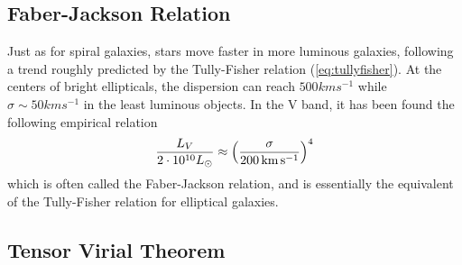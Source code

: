 \subsection{Faber-Jackson Relation}

Just as for spiral galaxies, stars move faster in more luminous galaxies, following a trend roughly predicted by the Tully-Fisher relation (\ref{eq:tullyfisher}). At the centers of bright ellipticals, the dispersion can reach $500 \unit{km}\unit{s}^{-1}$ while $\sigma \sim 50\unit{km}\unit{s}^{-1}$ in the least luminous objects. In the V band, it has been found the following empirical relation
\begin{equation}
    \frac{L_{V}}{2\cdot 10^{10}L_{\odot}} \approx \left(\frac{\sigma}{200 \,\text{km}\,\text{s}^{-1}}\right)^{4}
    \label{eq:faberjackson}
\end{equation}
which is often called the Faber-Jackson relation, and is essentially the equivalent of the Tully-Fisher relation for elliptical galaxies.

\subsection{Tensor Virial Theorem}

